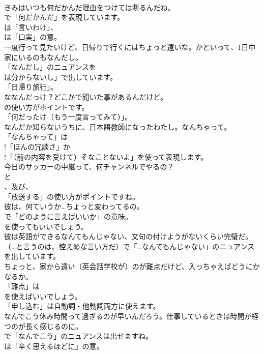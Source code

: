 \documentclass[8pt]{extreport}
\begin{document}
\begin{CJK}{UTF8}{min}
\\	きみはいつも何だかんだ理由をつけては断るんだね。 
\\	で「何だかんだ」を表現しています。
\\	は「言いわけ」、
\\	は「口実」の意。	
\\	一度行って見たいけど、日帰りで行くにはちょっと遠いな。かといって、1日中家にいるのもなんだし。 
\\	「なんだし」のニュアンスを
\\	は分からないし」で出しています。
\\	「日帰り旅行」。	
\\	ななんだっけ？どこかで聞いた事があるんだけど。 
\\	の使い方がポイントです。
\\	「何だったけ（もう一度言ってみて）」。	
\\	なんだか知らないうちに、日本語教師になったわたし。なんちゃって。 
\\	「なんちゃって」は
\\	!「ほんの冗談さ」か
\\	!「（前の内容を受けて）そなことないよ」を使って表現します。	
\\	今日のサッカーの中継って、何チャンネルでやるの？ 
\\	と
\\	、及び、
\\	「放送する」の使い方がポイントですね。	
\\	彼は、何ていうか…ちょっと変わってるの。 
\\	で「どのように言えばいいか」の意味。
\\	を使ってもいいでしょう。	
\\	彼は英語ができるなんてもんじゃない、文句の付けようがないくらい完璧だ。 
\\	（…と言うのは、控えめな言い方だ）で「…なんてもんじゃない」のニュアンスを出しています。	
\\	ちょっと、家から遠い（英会話学校が）のが難点だけど、入っちゃえばどうにかなるか。 
\\	「難点」は
\\	を使えばいいでしょう。
\\	「申し込む」は自動詞・他動詞両方に使えます。	
\\	なんでこう休み時間って過ぎるのが早いんだろう。仕事しているときは時間が経つのが長く感じるのに。 
\\	で「なんでこう」のニュアンスは出せますね。
\\	は「辛く思えるほどに」の意。	

\end{CJK}
\end{document}
